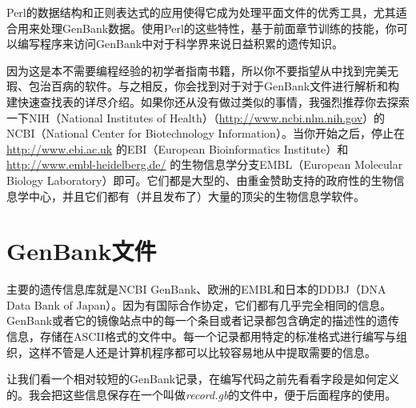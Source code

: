 Perl的数据结构和正则表达式的应用使得它成为处理平面文件的优秀工具，尤其适合用来处理GenBank数据。使用Perl的这些特性，基于前面章节训练的技能，你可以编写程序来访问GenBank中对于科学界来说日益积累的遗传知识。

因为这是本不需要编程经验的初学者指南书籍，所以你不要指望从中找到完美无瑕、包治百病的软件。与之相反，你会找到对于对于GenBank文件进行解析和构建快速查找表的详尽介绍。如果你还从没有做过类似的事情，我强烈推荐你去探索一下NIH（National Institutes of Health）（\href{http://www.ncbi.nlm.nih.gov}{http://www.ncbi.nlm.nih.gov}）的NCBI（National Center for Biotechnology Information）。当你开始之后，停止在 \href{http://www.ebi.ac.uk}{http://www.ebi.ac.uk} 的EBI（European Bioinformatics Institute）和 \href{http://www.embl-heidelberg.de/}{http://www.embl-heidelberg.de/} 的生物信息学分支EMBL（European Molecular Biology Laboratory）即可。它们都是大型的、由重金赞助支持的政府性的生物信息学中心，并且它们都有（并且发布了）大量的顶尖的生物信息学软件。

\section{GenBank文件}
主要的遗传信息库就是NCBI GenBank、欧洲的EMBL和日本的DDBJ（DNA Data Bank
of
Japan）。因为有国际合作协定，它们都有几乎完全相同的信息。GenBank或者它的镜像站点中的每一个条目或者记录都包含确定的描述性的遗传信息，存储在ASCII格式的文件中。每一个记录都用特定的标准格式进行编写与组织，这样不管是人还是计算机程序都可以比较容易地从中提取需要的信息。

让我们看一个相对较短的GenBank记录，在编写代码之前先看看字段是如何定义的。我会把这些信息保存在一个叫做\textit{record.gb}的文件中，便于后面程序的使用。

